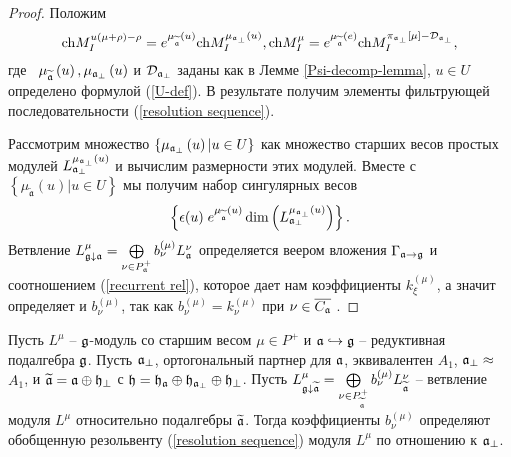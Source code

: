 \begin{proof}
Положим
\begin{equation*}
\mathrm{ch}M_{I}^{u\left( \mu +\rho \right) -\rho }=e^{\mu _{\widetilde{%
\frak{a}}}\left( u\right) }\mathrm{ch}M_{I}^{\mu _{\frak{a}_{\perp }}\left(
u\right) },\mathrm{ch}M_{I}^{\mu }=e^{\mu _{\widetilde{\frak{a}}}\left(
e\right) }\mathrm{ch}M_{I}^{\pi _{\frak{a}_{\perp }}\left[ \mu \right] -%
\mathcal{D}_{\frak{a}_{\perp }}},
\end{equation*}
где \ $\mu _{\widetilde{\frak{a}}}\left( u\right) ,\mu _{\frak{a}_{\perp
}}\left( u\right) $ и $\mathcal{D}_{\frak{a}_{\perp }}$ заданы как в Лемме \ref{Psi-decomp-lemma}, $%
u\in U$ определено формулой (\ref{U-def}). В результате получим элементы фильтрующей последовательности (\ref{resolution sequence}).

Рассмотрим множество $\left\{ \mu _{\frak{a}_{\perp }}\left( u\right) |u\in U\right\} $ как множество старших весов простых модулей $L_{\frak{a}%
_{\perp }}^{\mu _{\frak{a}_{\perp }}\left( u\right) }$ и вычислим размерности этих модулей. Вместе с 
$\left\{ \mu _{\widetilde{\mathfrak{a}}}\left( u\right) |u\in
U\right\} $ мы получим набор сингулярных весов
\begin{equation*}
\left\{ \epsilon (u)\;
e^{\mu _{\widetilde{\mathfrak{a}}}\left( u\right) }
\dim \left( L_{\frak{a}_{\perp }}^{\mu _{\frak{a}_{\perp
}}\left( u\right) }\right) \right\} .
\end{equation*}
Ветвление  $L_{\frak{g}\downarrow \frak{a}}^{\mu }=\bigoplus\limits_{\nu
\in P_{\frak{a}}^{+}}b_{\nu }^{\left( \mu \right) }L_{\frak{a}}^{\nu }$  определяется веером вложения  $\Gamma _{\frak{a}\rightarrow \frak{g}}$ и соотношением (\ref{recurrent rel}), которое дает нам коэффициенты  $k_{\xi
}^{\left( \mu \right) }$, а значит определяет и  $b_{\nu }^{\left( \mu \right) }$, так как  $b_{\nu }^{\left( \mu \right) }=k_{\nu }^{\left( \mu
\right) }$ при $\nu \in \overline{C_{\frak{a}}}$ .
\end{proof}

\begin{corollary}
Пусть  $L^{\mu }$ --  $\frak{g}$-модуль со старшим весом $\mu \in P^{+}$ и  $\frak{a}\hookrightarrow \frak{g}$ -- редуктивная подалгебра $\frak{g}$. Пусть $\frak{a}_{\perp }$, ортогональный партнер для $\frak{a}$, эквивалентен  $A_{1}$, $\frak{a}_{\perp }\approx $ $A_{1}$, и $\widetilde{\frak{a}}=\frak{a}\oplus \frak{h}_{\perp }$ с $\frak{h=\frak{h}_{\frak{a}}}\oplus \frak{h}_{\frak{a}_{\perp }}\oplus \frak{h}_{\perp }$. Пусть $L_{\frak{g}\downarrow \widetilde{\frak{a}}}^{\mu }=\bigoplus\limits_{\nu \in P_{\widetilde{\frak{a}}}^{+}}b_{\nu }^{\left( \mu \right) }L_{\widetilde{\frak{a}}}^{\nu }$ -- ветвление модуля $L^{\mu }$ относительно подалгебры $\widetilde{\frak{%
a}}$. Тогда коэффициенты $b_{\nu }^{\left( \mu \right) }$ определяют обобщенную резольвенту (\ref{resolution sequence}) модуля $L^{\mu }$
по отношению к  $\frak{a}_{\perp }$.
\end{corollary}

